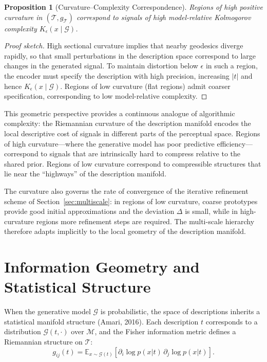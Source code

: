 \documentclass[11pt,a4paper]{article}
\newtheorem{proposition}[theorem]{Proposition}
\theoremstyle{definition}
\theoremstyle{remark}
\begin{document}
\begin{proposition}[Curvature--Complexity Correspondence]
Regions of high positive curvature in $(\mathcal{T}, g_\mathcal{T})$ correspond to signals of high model-relative Kolmogorov complexity $K_\epsilon(x \mid \mathcal{G})$.
\end{proposition}

\begin{proof}[Proof sketch]
High sectional curvature implies that nearby geodesics diverge rapidly, so that small perturbations in the description space correspond to large changes in the generated signal. To maintain distortion below $\epsilon$ in such a region, the encoder must specify the description with high precision, increasing $|t|$ and hence $K_\epsilon(x \mid \mathcal{G})$. Regions of low curvature (flat regions) admit coarser specification, corresponding to low model-relative complexity.
\end{proof}

This geometric perspective provides a continuous analogue of algorithmic complexity: the Riemannian curvature of the description manifold encodes the local descriptive cost of signals in different parts of the perceptual space. Regions of high curvature---where the generative model has poor predictive efficiency---correspond to signals that are intrinsically hard to compress relative to the shared prior. Regions of low curvature correspond to compressible structures that lie near the ``highways'' of the description manifold.

The curvature also governs the rate of convergence of the iterative refinement scheme of Section~\ref{sec:multiscale}: in regions of low curvature, coarse prototypes provide good initial approximations and the deviation $\Delta$ is small, while in high-curvature regions more refinement steps are required. The multi-scale hierarchy therefore adapts implicitly to the local geometry of the description manifold.

\section{Information Geometry and Statistical Structure}
\label{sec:infogeom}

When the generative model $\mathcal{G}$ is probabilistic, the space of descriptions inherits a statistical manifold structure (Amari, 2016). Each description $t$ corresponds to a distribution $\mathcal{G}(t, \cdot)$ over $\mathcal{M}$, and the Fisher information metric defines a Riemannian structure on $\mathcal{T}$:
\[
g_{ij}(t) = \mathbb{E}_{x \sim \mathcal{G}(t)} \left[ \partial_i \log p(x|t) \, \partial_j \log p(x|t) \right].
\]
\end{document}
